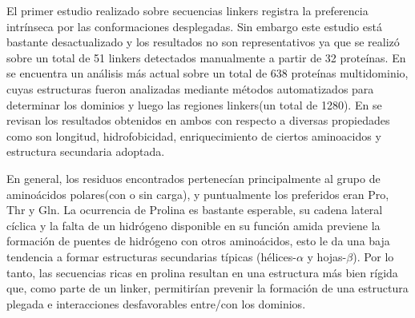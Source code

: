 El primer estudio realizado sobre secuencias linkers registra la preferencia intrínseca por las conformaciones desplegadas\cite{argos1990investigation}.   
Sin embargo este estudio está bastante desactualizado y los resultados no son representativos ya que se realizó sobre un total de 51 linkers detectados manualmente a partir de 32 proteínas.
En \cite{george2002analysis} se encuentra un análisis más actual sobre un total de 638 proteínas multidominio, cuyas estructuras fueron analizadas mediante métodos automatizados 
para determinar los dominios y luego las regiones linkers(un total de 1280).
En \cite{chen2013fusion} se revisan los resultados obtenidos en ambos con respecto a diversas propiedades como son longitud, hidrofobicidad, enriquecimiento de ciertos aminoacidos y estructura secundaria adoptada.


En general, los residuos encontrados pertenecían principalmente al grupo de aminoácidos polares(con o sin carga), 
y puntualmente los preferidos eran Pro, Thr y Gln.
La ocurrencia de Prolina es bastante esperable, su cadena lateral cíclica y la falta de un hidrógeno disponible 
en su función amida previene la formación de puentes de hidrógeno con otros aminoácidos, esto le da una baja 
tendencia a formar estructuras secundarias típicas (hélices-$\alpha$ y hojas-$\beta$).
Por lo tanto, las secuencias ricas en prolina resultan en una estructura más bien rígida que, como parte de un linker, permitirían 
prevenir la formación de una estructura plegada e interacciones desfavorables entre/con los dominios. 






